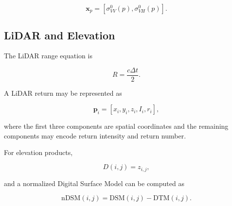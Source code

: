 \documentclass[
    11pt,
    a4paper,
    parskip=half,
    bibliography=totoc,
    numbers=noenddot
]{scrartcl}
\begin{document}
\[
\mathbf{x}_p =
\left[
\sigma^0_{VV}(p),
\sigma^0_{VH}(p)
\right].
\]

\subsection{LiDAR and Elevation}

The LiDAR range equation is

\[
R=\frac{c\Delta t}{2}.
\]

A LiDAR return may be represented as

\[
\mathbf{p}_i=
[x_i,y_i,z_i,I_i,r_i],
\]

where the first three components are spatial coordinates and the
remaining components may encode return intensity and return number.

For elevation products,

\[
D(i,j)=z_{i,j},
\]

and a normalized Digital Surface Model can be computed as

\[
\mathrm{nDSM}(i,j)=\mathrm{DSM}(i,j)-\mathrm{DTM}(i,j).
\]


\end{document}
